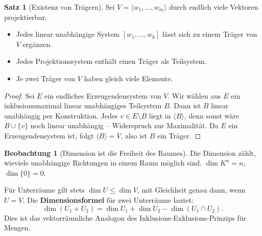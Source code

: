﻿\documentclass[a4paper,12pt]{report}
\theoremstyle{definition}
\newtheorem{satz}{Satz}
\newtheorem{beobachtung}{Beobachtung}
\begin{document}
\begin{satz}[Existenz von Trägern]
    Sei $V = \langle w_1, \dots, w_m \rangle$ durch endlich viele Vektoren
    projektierbar.
    \begin{itemize}
        \item[-] Jedes linear unabhängige System $[w_1, \dots, w_k]$ lässt sich
              zu einem Träger von $V$ ergänzen.
        \item[-] Jedes Projektionssystem enthält einen Träger als Teilsystem.
        \item[-] Je zwei Träger von $V$ haben gleich viele Elemente.
    \end{itemize}
\end{satz}
\begin{proof}
    Sei $E$ ein endliches Erzeugendensystem von $V$. Wir wählen aus $E$
    ein inklusionsmaximal linear unabhängiges Teilsystem $B$. Dann ist
    $B$ linear unabhängig per Konstruktion. Jedes $v \in E \setminus B$
    liegt in $\langle B \rangle$, denn sonst wäre $B \cup \{v\}$ noch linear
    unabhängig -- Widerspruch zur Maximalität. Da $E$ ein Erzeugendensystem ist,
    folgt $\langle B \rangle = V$, also ist $B$ ein Träger.
\end{proof}


\begin{beobachtung}[Dimension ist die Freiheit des Raumes]
    Die Dimension zählt, wieviele unabhängige Richtungen in einem Raum
    möglich sind. $\dim K^n = n$, $\dim \{0\} = 0$.

    Für Unterräume gilt stets $\dim U \le \dim V$, mit Gleichheit genau
    dann, wenn $U = V$. Die \textbf{Dimensionsformel} für zwei Unterräume
    lautet:
    \[
        \dim(U_1 + U_2) = \dim U_1 + \dim U_2 - \dim(U_1 \cap U_2).
    \]
    Dies ist das vektorräumliche Analogon des Inklusions-Exklusions-Prinzips
    für Mengen.
\end{beobachtung}
\end{document}
